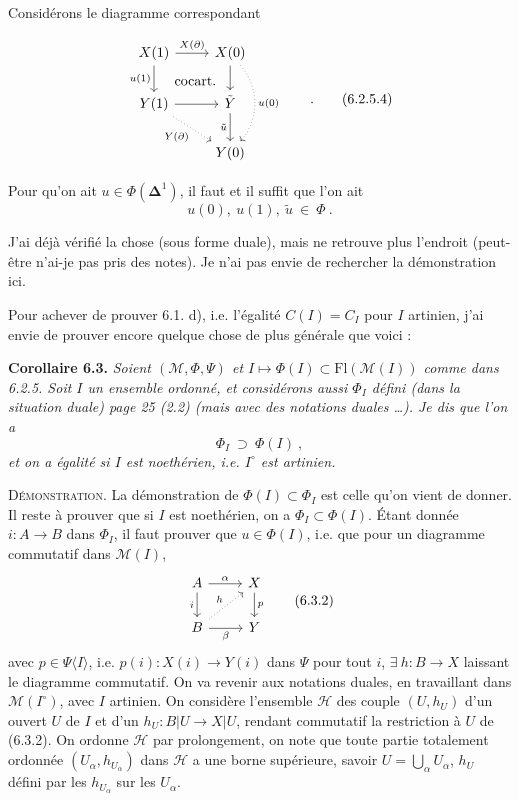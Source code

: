 \documentclass[11pt]{article}
\newcommand{\printedpage}[1]{\marginpar{\footnotesize p.~#1}}
\newcommand{\msp}[1]{\marginpar{\footnotesize [#1]}}
\begin{document}
Considérons le diagramme correspondant

\noindent\printedpage{54}\msp{page 108}
\[
\begin{tikzcd}
X(1) \arrow[r, "X(\partial)"] \arrow[d, "u(1)"'] \arrow[dr, phantom, "\text{cocart.}"] & X(0) \arrow[d] \arrow[dd, dotted, bend left=40, "u(0)"] \\
Y(1) \arrow[r] \arrow[dr, dotted, "Y(\partial)"'] & \tilde{Y} \arrow[d, "\tilde{u}"'] \\
 & Y(0)
\end{tikzcd}
\qquad .
\tag*{(6.2.5.4)}
\]

Pour qu'on ait $u \in \Phi(\boldsymbol{\Delta}^1)$, il faut et il suffit que l'on ait
\[
u(0),\ u(1),\ \tilde{u} \ \in\ \Phi\ .
\tag*{(6.2.5.5)}
\]

J'ai déjà vérifié la chose (sous forme duale), mais ne retrouve plus l'endroit (peut-être n'ai-je pas pris des notes). Je n'ai pas envie de rechercher la démonstration ici.

Pour achever de prouver 6.1. d), i.e. l'égalité $C(I) = C_I$ pour $I$ artinien, j'ai envie de prouver encore quelque chose de plus générale que voici : %

\textbf{Corollaire 6.3.} \textit{Soient $(\mathcal{M}, \Phi, \Psi)$ et $I \longmapsto \Phi(I) \subset \mathrm{Fl}(\mathcal{M}(I))$ comme dans \textup{6.2.5.} Soit $I$ un ensemble ordonné, et considérons aussi $\Phi_I$ défini (dans la situation duale) page \textup{25 (2.2)} (mais avec des notations duales \dots). Je dis que l'on a}
\[
\Phi_I \ \supset\ \Phi(I)\ ,
\tag*{(6.3.1)}
\]
\msp{page 109}\textit{et on a égalité si $I$ est noethérien, i.e. $I^{\circ}$ est artinien.}

\textsc{Démonstration}. La démonstration de $\Phi(I) \subset \Phi_I$ est celle qu'on vient de donner. Il reste à prouver que si $I$ est noethérien, on a $\Phi_I \subset \Phi(I)$. Étant donnée $i : A \longrightarrow B$ dans $\Phi_I$, il faut prouver que $u \in \Phi(I)$, %
i.e. que pour un diagramme commutatif dans $\mathcal{M}(I)$,
\[
\begin{tikzcd}
A \arrow[r, "\alpha"] \arrow[d, "i"'] & X \arrow[d, "p"] \\
B \arrow[r, "\beta"'] \arrow[ur, dotted, "h"] & Y
\end{tikzcd}
\tag*{(6.3.2)}
\]
avec $p \in \Psi\langle I\rangle$, i.e. $p(i) : X(i) \longrightarrow Y(i)$ dans $\Psi$ pour tout $i$, $\exists\ h : B \longrightarrow X$ laissant le diagramme commutatif. On va revenir aux notations duales, en travaillant dans $\mathcal{M}(I^{\circ})$, avec $I$ artinien. On considère l'ensemble $\mathcal{H}$ des couple %
$(U, h_U)$ d'un ouvert $U$ de $I$ et d'un $h_U : B|U \longrightarrow X|U$, rendant commutatif la restriction à $U$ de (6.3.2). %
On ordonne $\mathcal{H}$ par prolongement, on note que toute partie totalement ordonnée $(U_\alpha, h_{U_\alpha})$ dans $\mathcal{H}$ a une borne supérieure, savoir $U = \bigcup_\alpha U_\alpha$, $h_U$ défini par les $h_{U_\alpha}$ sur les $U_\alpha$.
\end{document}
